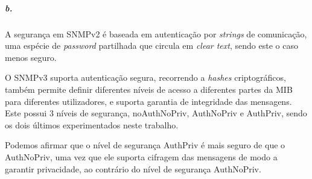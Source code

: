\subparagraph{b.}
A segurança em SNMPv2 é baseada em autenticação por \emph{strings} de comunicação, uma espécie de \emph{password} partilhada que circula em \emph{clear text}, sendo este o caso menos seguro.

O SNMPv3 suporta autenticação segura, recorrendo a \emph{hashes} criptográficos, também permite definir diferentes níveis de acesso a diferentes partes da MIB para diferentes utilizadores, e suporta garantia de integridade das mensagens.
Este possui 3 níveis de segurança, \textsf{noAuthNoPriv}, \textsf{AuthNoPriv} e \textsf{AuthPriv}, sendo os dois últimos experimentados neste trabalho.

Podemos afirmar que o nível de segurança \textsf{AuthPriv} é mais seguro de que o \textsf{AuthNoPriv}, uma vez que ele suporta cifragem das mensagens de modo a garantir privacidade, ao contrário do nível de segurança \textsf{AuthNoPriv}.